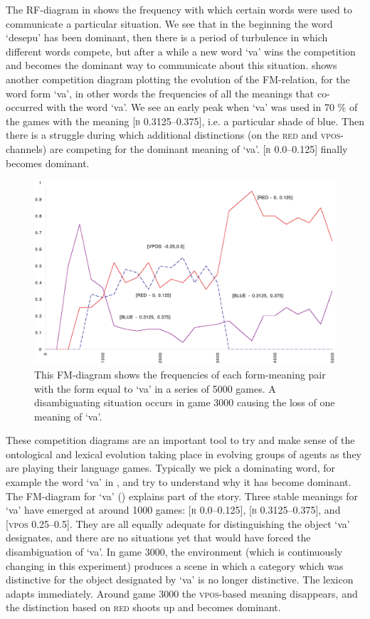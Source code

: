 The RF-diagram in  shows the 
frequency with which certain words were used to communicate 
a particular situation. We see that in
the beginning the word `desepu' has been dominant, then 
there is a period of turbulence in which different 
words compete, but after a while a new word `va' wins 
the competition and becomes the dominant way to communicate 
about this situation.  shows another
competition diagram plotting the evolution of the FM-relation, for 
the word form `va', in other words the frequencies of 
all the meanings that co-occurred with the word `va'. 
We see an early peak when `va' was used in 70 \% of the 
games with the meaning [\textsc{b} 0.3125–0.375], i.e. a particular
shade of blue. Then there is a struggle during which additional
distinctions (on the \textsc{red} and \textsc{vpos}-channels) are competing
for the dominant meaning of `va'. 
[\textsc{r} 0.0–0.125] finally becomes dominant. 

\begin{figure}[htbp]
  \centerline{\includegraphics[width=.80\textwidth]{chap7/figs/fm.pdf}}
\caption{\label{FM-diagram}This FM-diagram shows
the frequencies of each form-meaning pair with 
the form equal to `va' in a series of 5000 games.
A disambiguating situation occurs in game 3000
causing the loss of one meaning of `va'.}
\end{figure}

These competition diagrams are an important tool to try 
and make sense of the ontological and lexical evolution
taking place in evolving groups of agents as they are
playing their language games. Typically we pick
a dominating word, for example the word `va' in 
, and try to understand
why it has become dominant. 
The FM-diagram for `va' () explains
part of the story. Three stable meanings for `va' have emerged
at  around 1000 games: 
[\textsc{r} 0.0–0.125], [\textsc{b} 0.3125–0.375], and [\textsc{vpos} 0.25–0.5]. 
They are all equally adequate for distinguishing the object
`va' designates, and there are no situations yet
that would have forced the disambiguation of `va'. 
In game 3000, the environment (which is continuously 
changing in this experiment) produces a scene in which
a category which was distinctive for the object designated by 
`va' is no longer distinctive. The lexicon adapts 
immediately. Around game 3000 the \textsc{vpos}-based meaning disappears, 
and the distinction based on \textsc{red} shoots up and becomes dominant. 

